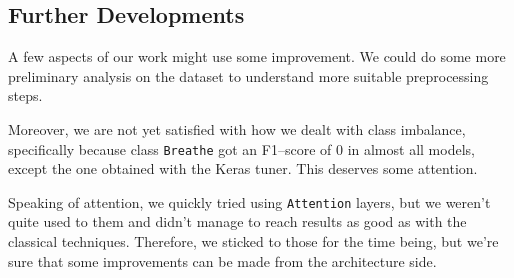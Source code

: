 \documentclass[conference,compsoc,11pt]{IEEEtran}
\begin{document}
\subsection{Further Developments}

A few aspects of our work might use some improvement. We could do some more preliminary analysis on the dataset to understand more suitable preprocessing steps.

Moreover, we are not yet satisfied with how we dealt with class imbalance, specifically because class \texttt{Breathe} got an F1--score of 0 in almost all models, except the one obtained with the Keras tuner. This deserves some attention.

Speaking of attention, we quickly tried using \texttt{Attention} layers, but we weren't quite used to them and didn't manage to reach results as good as with the classical techniques. Therefore, we sticked to those for the time being, but we're sure that some improvements can be made from the architecture side.

\end{document}
